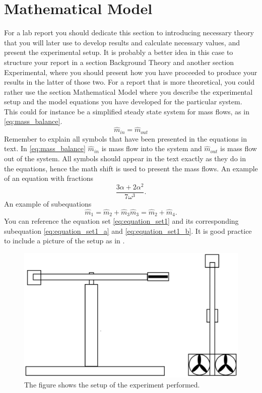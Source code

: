 \section{Mathematical Model}
\label{sec:problem_description}
For a lab report you should dedicate this section to introducing necessary theory that you will later use to develop results and calculate necessary values, and present the experimental setup. It is probably a better idea in this case to structure your report in a section Background Theory and another section Experimental, where you should present how you have proceeded to produce your results in the latter of those two. For a report that is more theoretical, you could rather use the section Mathematical Model where you describe the experimental setup and the model equations you have developed for the particular system. This could for instance be a simplified steady state system for mass flows, as in \eqref{eq:mass_balance}.
\begin{equation}
    \label{eq:mass_balance}
    \hat{m}_{in} = \hat{m}_{out}
\end{equation}
Remember to explain all symbols that have been presented in the equations in text. In \eqref{eq:mass_balance} $\hat{m}_{in}$ is mass flow into the system and $\hat{m}_{out}$ is mass flow out of the system. All symbols should appear in the text exactly as they do in the equations, hence the math shift is used to present the mass flows.
An example of an equation with fractions
\begin{equation}
    \frac
    {3\alpha + 2\alpha^2}
    {7\omega^3}.
\end{equation}
An example of subequations
\begin{subequations}
    \label{eq:equation_set1}
    \begin{equation}
        \label{eq:equation_set1_a}
        \hat{m}_{1} = \hat{m}_{2} + \hat{m}_{3}
    \end{equation}
    \begin{equation}
        \label{eq:equation_set1_b}
        \hat{m}_{3} = \hat{m}_{2} + \hat{m}_{4}.
    \end{equation}
\end{subequations}
You can reference the equation set \eqref{eq:equation_set1} and its corresponding subequation \eqref{eq:equation_set1_a} and \eqref{eq:equation_set1_b}.
It is good practice to include a picture of the setup as in .
\begin{figure}[htb]
    \centering
    \includegraphics[scale=0.5]{Mathematical_model/figures/helikopter.eps}
    \caption{The figure shows the setup of the experiment performed.}
    \label{fig:setup}
\end{figure}
